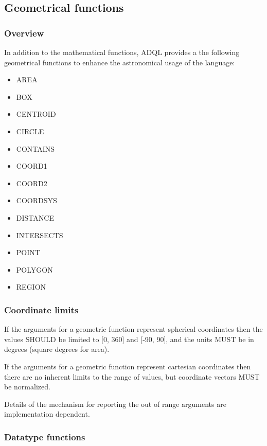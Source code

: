 \documentclass[11pt,a4paper]{ivoa}
\begin{document}
\subsection{Geometrical functions}
\label{sec:functions.geom}
\subsubsection{Overview}
\label{sec:functions.geom.overview}

In addition to the mathematical functions, ADQL provides a the following geometrical
functions to enhance the astronomical usage of the language:

\begin{itemize}
    \item AREA
    \item BOX
    \item CENTROID
    \item CIRCLE
    \item CONTAINS
    \item COORD1
    \item COORD2
    \item COORDSYS
    \item DISTANCE
    \item INTERSECTS
    \item POINT
    \item POLYGON
    \item REGION
\end{itemize}

\subsubsection{Coordinate limits}
\label{sec:functions.geom.limits}

If the arguments for a geometric function represent spherical coordinates
then the values SHOULD be limited to [0, 360] and [-90, 90],
and the units MUST be in degrees (square degrees for area).
            
If the arguments for a geometric function represent cartesian coordinates
then there are no inherent limits to the range of values, but
coordinate vectors MUST be normalized.

Details of the mechanism for reporting the out of range arguments are
implementation dependent.

\subsubsection{Datatype functions}
\label{sec:functions.geom.type}
\end{document}
